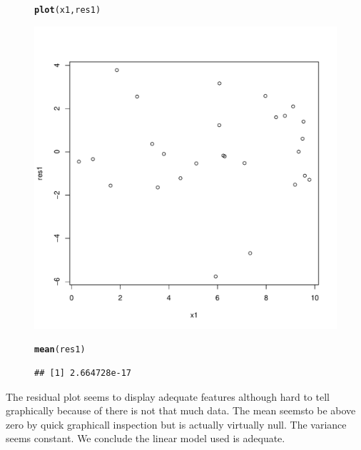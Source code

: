 \documentclass{article}\usepackage[]{graphicx}\usepackage[]{color}
\makeatletter
\def\maxwidth{ %
  \ifdim\Gin@nat@width>\linewidth
    \linewidth
  \else
    \Gin@nat@width
  \fi
}
\newcommand{\hlstd}[1]{\textcolor[rgb]{0.345,0.345,0.345}{#1}}%
\newcommand{\hlkwd}[1]{\textcolor[rgb]{0.737,0.353,0.396}{\textbf{#1}}}%
\newenvironment{kframe}{%
 \def\at@end@of@kframe{}%
 \ifinner\ifhmode%
  \def\at@end@of@kframe{\end{minipage}}%
  \begin{minipage}{\columnwidth}%
 \fi\fi%
 \def\FrameCommand##1{\hskip\@totalleftmargin \hskip-\fboxsep
 \colorbox{shadecolor}{##1}\hskip-\fboxsep
     \hskip-\linewidth \hskip-\@totalleftmargin \hskip\columnwidth}%
 \MakeFramed {\advance\hsize-\width
   \@totalleftmargin\z@ \linewidth\hsize
   \@setminipage}}%
 {\par\unskip\endMakeFramed%
 \at@end@of@kframe}
\newenvironment{knitrout}{}{} %
\makeatother
\begin{document}
\begin{figure}[htbp]
\begin{knitrout}
\color{fgcolor}\begin{kframe}
\begin{alltt}
\hlkwd{plot}\hlstd{(x1,res1)}
\end{alltt}
\end{kframe}
\includegraphics[width=\maxwidth]{figure/unnamed-chunk-3-1} 
\begin{kframe}\begin{alltt}
\hlkwd{mean}\hlstd{(res1)}
\end{alltt}
\begin{verbatim}
## [1] 2.664728e-17
\end{verbatim}
\end{kframe}
\end{knitrout}
\end{figure}
The residual plot seems to display adequate features although hard to tell graphically because of there is not that much data. The mean seemsto be above zero by quick graphicall inspection but is actually virtually null. The variance seems constant. We conclude the linear model used is adequate.



\clearpage
\end{document}
